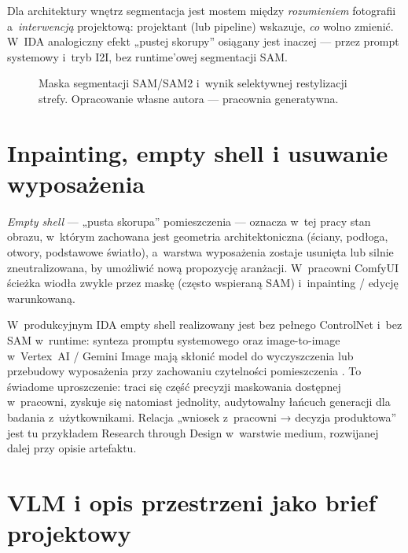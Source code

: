 Dla architektury wnętrz segmentacja jest mostem między \emph{rozumieniem} fotografii a~\emph{interwencją} projektową: projektant (lub pipeline) wskazuje, \emph{co} wolno zmienić. W~IDA analogiczny efekt „pustej skorupy” osiągany jest inaczej --- przez prompt systemowy i~tryb I2I, bez runtime'owej segmentacji SAM.

\begin{figure}[htbp]
  \centering
  \caption{Maska segmentacji SAM/SAM2 i~wynik selektywnej restylizacji strefy.
  Opracowanie własne autora --- pracownia generatywna.}
  \label{fig:ch04:sam}
\end{figure}

\section{Inpainting, empty shell i usuwanie wyposażenia}
\label{ch04:sec:inpaint}

\emph{Empty shell} --- „pusta skorupa” pomieszczenia --- oznacza w~tej pracy stan obrazu, w~którym zachowana jest geometria architektoniczna (ściany, podłoga, otwory, podstawowe światło), a~warstwa wyposażenia zostaje usunięta lub silnie zneutralizowana, by umożliwić nową propozycję aranżacji. W~pracowni ComfyUI ścieżka wiodła zwykle przez maskę (często wspieraną SAM) i~inpainting / edycję warunkowaną.

W~produkcyjnym IDA empty shell realizowany jest bez pełnego ControlNet i~bez SAM w~runtime: synteza promptu systemowego oraz image-to-image w~Vertex~AI / Gemini Image mają skłonić model do wyczyszczenia lub przebudowy wyposażenia przy zachowaniu czytelności pomieszczenia \parencite{idaPlatform2026}. To świadome uproszczenie: traci się część precyzji maskowania dostępnej w~pracowni, zyskuje się natomiast jednolity, audytowalny łańcuch generacji dla badania z~użytkownikami. Relacja „wniosek z~pracowni → decyzja produktowa” jest tu przykładem Research through Design w~warstwie medium, rozwijanej dalej przy opisie artefaktu.

\section{VLM i opis przestrzeni jako brief projektowy}
\label{ch04:sec:vlm}

